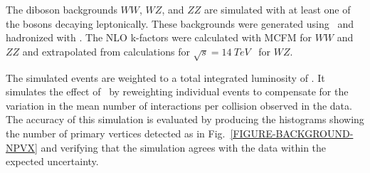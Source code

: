 The diboson backgrounds $WW$, $WZ$, and $ZZ$ are simulated with at least one of the bosons decaying leptonically. These backgrounds were generated using \ALPGEN\ and hadronized with \HERWIG. The NLO k-factors were calculated with MCFM for $WW$ and $ZZ$ and extrapolated from calculations for $\sqrt{s} = 14\ TeV$~\cite{Campbell1999} for $WZ$.

The simulated events are weighted to a total integrated luminosity of \LUMI. It simulates the effect of \pileup\ by reweighting individual events to compensate for the variation in the mean number of interactions per collision observed in the data. The accuracy of this simulation is evaluated by producing the histograms showing the number of primary vertices detected as in Fig.~\ref{FIGURE-BACKGROUND-NPVX} and verifying that the simulation agrees with the data within the expected uncertainty.



